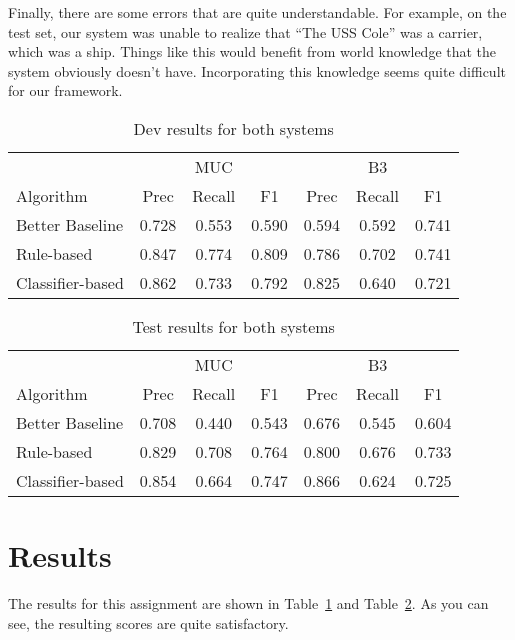 \documentclass[12pt, twocolumn]{article}
\begin{document}
Finally, there are some errors that are quite understandable. For example, on the test set, our system was unable to realize that ``The USS Cole'' was a carrier, which was a ship. Things like this would benefit from world knowledge that the system obviously doesn't have. Incorporating this knowledge seems quite difficult for our framework.
\begin{table}[H]
\begin{minipage}{\textwidth}
\centering
\begin{tabular}{l|c c c|c c c}
\hline
& & MUC & & & B3 & \\
Algorithm & Prec & Recall & F1 & Prec & Recall & F1 \\\hline
Better Baseline & 0.728 & 0.553 & 0.590 & 0.594 & 0.592 & 0.741 \\\hline
Rule-based & 0.847 & 0.774 & 0.809 & 0.786 & 0.702 & 0.741 \\\hline  
Classifier-based & 0.862 & 0.733 & 0.792 & 0.825 & 0.640 & 0.721 \\\hline
\end{tabular}
\caption{Dev results for both systems}\label{tab:devresults}
\end{minipage}
\end{table}
\begin{table}[H]
\begin{minipage}{\textwidth}
\centering
\begin{tabular}{l|c c c|c c c}
\hline
& & MUC & & & B3 & \\
Algorithm & Prec & Recall & F1 & Prec & Recall & F1 \\\hline
Better Baseline & 0.708 & 0.440 & 0.543 & 0.676 & 0.545 & 0.604 \\\hline
Rule-based & 0.829 & 0.708 & 0.764 & 0.800 & 0.676 & 0.733 \\\hline  
Classifier-based & 0.854 & 0.664 & 0.747 & 0.866 & 0.624 & 0.725 \\\hline
\end{tabular}
\caption{Test results for both systems}\label{tab:testresults}
\end{minipage}
\end{table}
\section{Results}
The results for this assignment are shown in Table~\ref{tab:devresults} and Table~\ref{tab:testresults}. As you can see, the resulting scores are quite satisfactory.
\end{document}
